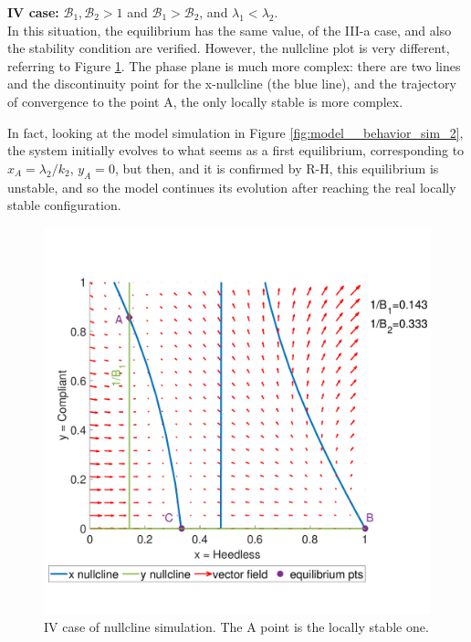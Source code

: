 \textbf{IV case: } $\mathcal{B}_1, \mathcal{B}_2 >1$ and $\mathcal{B}_1 >  \mathcal{B}_2$, and $\lambda_1 < \lambda_2$. \\
\label{par:behav_4_case}
In this situation, the equilibrium has the same value, of the III-a case, and also the stability condition are verified. However, the nullcline plot is very different, referring to Figure \ref{fig:prnullclineb1_mag_b2_lambda}. The phase plane is much more complex: there are two lines and the discontinuity point for the x-nullcline (the blue line), and the trajectory of convergence to the point A, the only locally stable is more complex.  

In fact, looking at the model simulation in Figure \ref{fig:model__behavior_sim_2}, the system initially evolves to what seems as a first equilibrium, corresponding to $x_A = \lambda_2/k_2$, $y_A = 0$, but then, and it is confirmed by R-H, this equilibrium is unstable, and so the model continues its evolution after reaching the real locally stable configuration. 
\begin{figure}[h]
	\centering
	\includegraphics[width=0.48\linewidth]{1_corpo/figure/behavioural_equilibrium/Pr_nullcline_B1_mag_B2_lambda2_mag}
	\caption[Nullcline fourth case]{IV case of nullcline simulation. The A point is the locally stable one.}
	\label{fig:prnullclineb1_mag_b2_lambda}
\end{figure}

